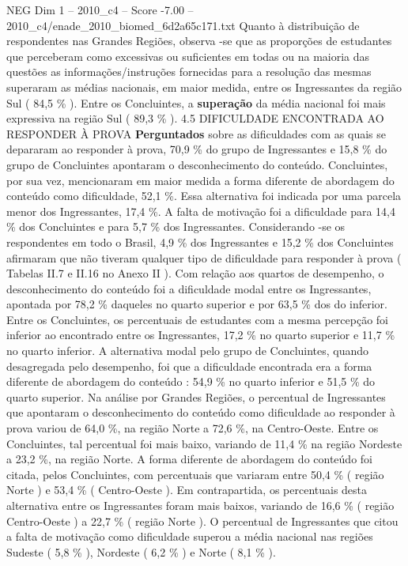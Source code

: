 \begin{textsample}{NEG Dim 1 – 2010\_c4 – Score -7.00 – 2010\_c4/enade\_2010\_biomed\_6d2a65c171.txt}
Quanto à distribuição de respondentes nas Grandes Regiões, observa -se que as proporções de estudantes que perceberam como excessivas ou suficientes em todas ou na maioria das questões as informações/instruções fornecidas para a resolução das mesmas superaram as médias nacionais, em maior medida, entre os Ingressantes da região Sul ( 84,5 \% ).
Entre os Concluintes, a \textbf{superação} da média nacional foi mais expressiva na região Sul ( 89,3 \% ). 4.5 DIFICULDADE ENCONTRADA AO RESPONDER À PROVA \textbf{Perguntados} sobre as dificuldades com as quais se depararam ao responder à prova, 70,9 \% do grupo de Ingressantes e 15,8 \% do grupo de Concluintes apontaram o desconhecimento do conteúdo.
Concluintes, por sua vez, mencionaram em maior medida a forma diferente de abordagem do conteúdo como dificuldade, 52,1 \%.
Essa alternativa foi indicada por uma parcela menor dos Ingressantes, 17,4 \%.
A falta de motivação foi a dificuldade para 14,4 \% dos Concluintes e para 5,7 \% dos Ingressantes.
Considerando -se os respondentes em todo o Brasil, 4,9 \% dos Ingressantes e 15,2 \% dos Concluintes afirmaram que não tiveram qualquer tipo de dificuldade para responder à prova ( Tabelas II.7 e II.16 no Anexo II ).
Com relação aos quartos de desempenho, o desconhecimento do conteúdo foi a dificuldade modal entre os Ingressantes, apontada por 78,2 \% daqueles no quarto superior e por 63,5 \% dos do inferior.
Entre os Concluintes, os percentuais de estudantes com a mesma percepção foi inferior ao encontrado entre os Ingressantes, 17,2 \% no quarto superior e 11,7 \% no quarto inferior.
A alternativa modal pelo grupo de Concluintes, quando desagregada pelo desempenho, foi que a dificuldade encontrada era a forma diferente de abordagem do conteúdo : 54,9 \% no quarto inferior e 51,5 \% do quarto superior.
Na análise por Grandes Regiões, o percentual de Ingressantes que apontaram o desconhecimento do conteúdo como dificuldade ao responder à prova variou de 64,0 \%, na região Norte a 72,6 \%, na Centro-Oeste.
Entre os Concluintes, tal percentual foi mais baixo, variando de 11,4 \% na região Nordeste a 23,2 \%, na região Norte.
A forma diferente de abordagem do conteúdo foi citada, pelos Concluintes, com percentuais que variaram entre 50,4 \% ( região Norte ) e 53,4 \% ( Centro-Oeste ).
Em contrapartida, os percentuais desta alternativa entre os Ingressantes foram mais baixos, variando de 16,6 \% ( região Centro-Oeste ) a 22,7 \% ( região Norte ).
O percentual de Ingressantes que citou a falta de motivação como dificuldade superou a média nacional nas regiões Sudeste ( 5,8 \% ), Nordeste ( 6,2 \% ) e Norte ( 8,1 \% ).

\end{textsample}
